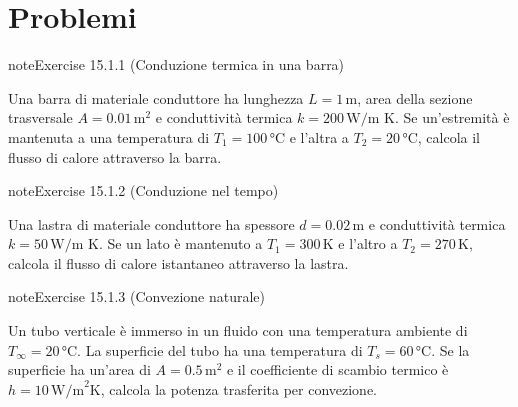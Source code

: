 \documentclass[letterpaper,10pt,italian]{jupyterBook}
\begin{document}
\section{Problemi}
\label{\detokenize{ch/thermodynamics/heat-transmission-problems:problemi}}\label{\detokenize{ch/thermodynamics/heat-transmission-problems:physics-hs-thermodynamics-heat-transmission-problems}}\label{\detokenize{ch/thermodynamics/heat-transmission-problems::doc}} \label{exercise:ch/thermodynamics/heat-transmission-problems-exercise-0}

\begin{sphinxadmonition}{note}{Exercise 15.1.1 (Conduzione termica in una barra)}



\sphinxAtStartPar
Una barra di materiale conduttore ha lunghezza \(L = 1 \, \text{m}\), area della sezione trasversale \(A = 0.01 \, \text{m}^2\) e conduttività termica \(k = 200 \, \text{W/m K}\). Se un’estremità è mantenuta a una temperatura di \(T_1 = 100 \, \text{°C}\) e l’altra a \(T_2 = 20 \, \text{°C}\), calcola il flusso di calore attraverso la barra.
\end{sphinxadmonition}
 \label{exercise:ch/thermodynamics/heat-transmission-problems-exercise-1}

\begin{sphinxadmonition}{note}{Exercise 15.1.2 (Conduzione nel tempo)}



\sphinxAtStartPar
Una lastra di materiale conduttore ha spessore \(d = 0.02 \, \text{m}\) e conduttività termica \(k = 50 \, \text{W/m K}\). Se un lato è mantenuto a \(T_1 = 300 \, \text{K}\) e l’altro a \(T_2 = 270 \, \text{K}\), calcola il flusso di calore istantaneo attraverso la lastra.
\end{sphinxadmonition}
 \label{exercise:ch/thermodynamics/heat-transmission-problems-exercise-2}

\begin{sphinxadmonition}{note}{Exercise 15.1.3 (Convezione naturale)}



\sphinxAtStartPar
Un tubo verticale è immerso in un fluido con una temperatura ambiente di \(T_\infty = 20 \, \text{°C}\). La superficie del tubo ha una temperatura di \(T_s = 60 \, \text{°C}\). Se la superficie ha un’area di \(A = 0.5 \, \text{m}^2\) e il coefficiente di scambio termico è \(h = 10 \, \text{W/m}^2\text{K}\), calcola la potenza trasferita per convezione.
\end{sphinxadmonition}
 \label{exercise:ch/thermodynamics/heat-transmission-problems-exercise-3}
\end{document}
